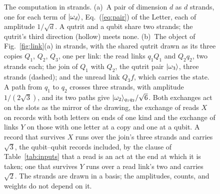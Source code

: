 \begin{figure}[h]
\caption{The computation in strands. (a)~A pair of dimension $d$ as $d$ strands, one for each term of $|\omega_{d}\rangle$, Eq.~(\ref{eq:pair}) of the Letter, each of amplitude $1/\sqrt{d}$. A qutrit and a qubit share two strands; the qutrit's third direction (hollow) meets none. (b)~The object of Fig.~\ref{fig:link}(a) in strands, with the shared qutrit drawn as its three copies $Q_{1}$, $Q_{2}$, $Q_{3}$, one per link: the read links $q_{1}Q_{1}$ and $Q_{2}q_{2}$, two strands each; the join of $Q_{1}$ with $Q_{2}$, the qutrit pair $|\omega_{3}\rangle$, three strands (dashed); and the unread link $Q_{3}f$, which carries the state. A path from $q_{1}$ to $q_{2}$ crosses three strands, with amplitude $1/(2\sqrt{3})$, and its two paths give $|\omega_{2}\rangle_{q_{1}q_{2}}/\sqrt{6}$. Both exchanges act on the slots as the mirror of the drawing, the exchange of reads $X$ on records with both letters on ends of one kind and the exchange of links $Y$ on those with one letter at a copy and one at a qubit. A record that survives $X$ runs over the join's three strands and carries $\sqrt{3}$, the qubit--qubit records included, by the clause of Table~\ref{tab:inputs} that a read is an act at the end at which it is taken; one that survives $Y$ runs over a read link's two and carries $\sqrt{2}$. The strands are drawn in a basis; the amplitudes, counts, and weights do not depend on it.}
\label{fig:s-strands}
\end{figure}
